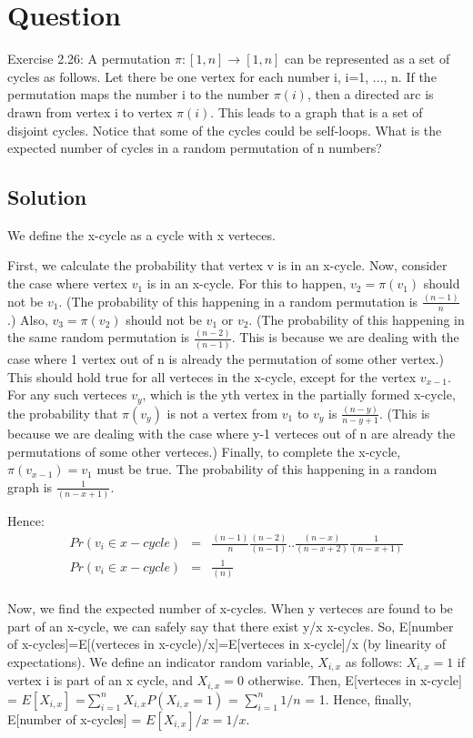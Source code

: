 \documentclass[10pt]{article}
\begin{document}
\section{Question}

Exercise 2.26: A permutation $\pi: [1, n] \rightarrow [1, n]$ can be represented as a set of cycles as follows. Let there be one vertex for each number i, i=1, ..., n. If the permutation maps the number i to the number $\pi(i)$, then a directed arc is drawn from vertex i to vertex $\pi(i)$. This leads to a graph that is a set of disjoint cycles. Notice that some of the cycles could be self-loops. What is the expected number of cycles in a random permutation of n numbers?

\subsection{Solution}

We define the x-cycle as a cycle with x verteces. 

First, we calculate the probability that vertex v is in an x-cycle. Now, consider the case where vertex $v_{1}$ is in an x-cycle. For this to happen, $v_{2}=\pi(v_{1})$ should not be $v_{1}$. (The probability of this happening in a random permutation is $\frac{(n-1)}{n}$.) Also, $v_{3}=\pi(v_{2})$ should not be $v_{1}$ or $v_{2}$. (The probability of this happening in the same random permutation is $\frac{(n-2)}{(n-1)}$. This is because we are dealing with the case where 1 vertex out of n is already the permutation of some other vertex.) This should hold true for all verteces in the x-cycle, except for the vertex $v_{x-1}$. For any such verteces $v_{y}$, which is the yth vertex in the partially formed x-cycle, the probability that $\pi(v_{y})$ is not a vertex from $v_{1}$ to $v_{y}$ is $\frac{(n-y)}{n-y+1}$. (This is because we are dealing with the case where y-1 verteces out of n are already the permutations of some other verteces.) Finally, to complete the x-cycle, $\pi(v_{x-1})=v_{1}$ must be true. The probability of this happening in a random graph is $\frac{1}{(n-x+1)}$.

Hence:
\begin{eqnarray}
Pr(v_{i} \in x-cycle) &=& \frac{(n-1)}{n}\frac{(n-2)}{(n-1)}..\frac{(n-x)}{(n-x+2)}\frac{1}{(n-x+1)}\\
Pr(v_{i} \in x-cycle) &=& \frac{1}{(n)}\\
\end{eqnarray}

Now, we find the expected number of x-cycles. When y verteces are found to be part of an x-cycle, we can safely say that there exist y/x x-cycles. So, E[number of x-cycles]=E[(verteces in x-cycle)/x]=E[verteces in x-cycle]/x (by linearity of expectations). We define an indicator random variable, $X_{i,x}$ as follows:  $X_{i,x}=1$ if vertex i is part of an x cycle, and $X_{i,x}=0$ otherwise. Then, E[verteces in x-cycle] = $E[X_{i,x}]$ =$\sum_{i=1}^{n}X_{i,x}P(X_{i,x}=1)$ = $\sum_{i=1}^{n}1/n$ = 1. Hence, finally, E[number of x-cycles] = $E[X_{i,x}]/x=1/x$.
\end{document}
